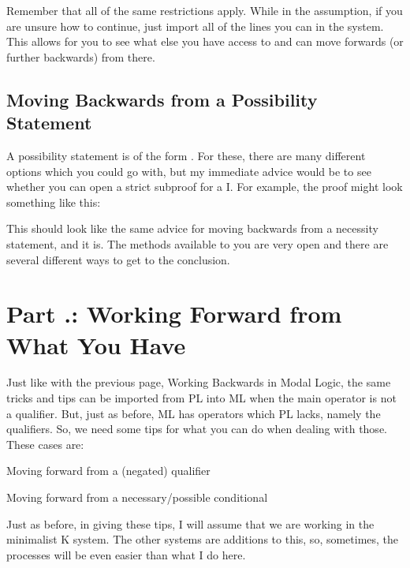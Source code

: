 Remember that all of the same restrictions apply. While in the assumption, if you are unsure how to continue, just import all of the lines you can in the system. This allows for you to see what else you have access to and can move forwards (or further backwards) from there.

\subsection{Moving Backwards from a Possibility Statement}

A possibility statement is of the form \ediamond {}. For these, there are many different options which you could go with, but my immediate advice would be to see whether you can open a strict subproof for a \ediamond I. For example, the proof might look something like this:

\begin{fitchproof}
\ellipsesline
{}			
\open
{}
\have[]{}{}
\ellipsesline
{}
\close
{}
\end{fitchproof}

This should look like the same advice for moving backwards from a necessity statement, and it is. The methods available to you are very open and there are several different ways to get to the conclusion.
\section{Part \thechapcount.\theseccount: Working Forward from What You Have}
Just like with the previous page, Working Backwards in Modal Logic, the same tricks and tips can be imported from PL into ML when the main operator is not a qualifier. But, just as before, ML has operators which PL lacks, namely the qualifiers. So, we need some tips for what you can do when dealing with those. These cases are:
\begin{ebullet}
\item[\textbullet] Moving forward from a (negated) qualifier
\item[\textbullet] Moving forward from a necessary/possible conditional
\end{ebullet}
Just as before, in giving these tips, I will assume that we are working in the minimalist K system. The other systems are additions to this, so, sometimes, the processes will be even easier than what I do here. 

